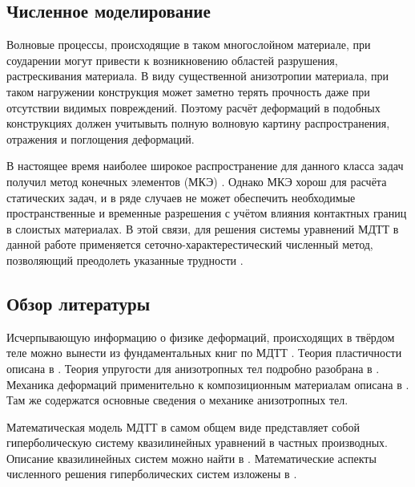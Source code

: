 \subsection*{Численное моделирование}
		
	Волновые процессы, происходящие в таком многослойном материале, при соударении могут привести к возникновению областей разрушения, растрескивания материала.
	В виду существенной анизотропии материала, при таком нагружении конструкция может заметно терять прочность даже при отсутствии видимых повреждений.
	Поэтому расчёт деформаций в подобных конструкциях должен учитывыть полную волновую картину распространения, отражения и поглощения деформаций.
	
	В настоящее время наиболее широкое распространение для данного класса задач получил метод конечных элементов (МКЭ) \cite{jp}. 
	Однако МКЭ хорош для расчёта статических задач, и в ряде случаев не может обеспечить необходимые пространственные и временные разрешения с учётом влияния контактных границ в слоистых материалах.
	В этой связи, для решения системы уравнений МДТТ в данной работе применяется сеточно-характерестический численный метод, позволяющий преодолеть указанные трудности \cite{magomedov, petrov_book, petrov_tormasov_holodov, petrov}.
	
\subsection*{Обзор литературы}
	
	Исчерпывающую информацию о физике деформаций, происходящих в твёрдом теле можно вынести из фундаментальных книг по МДТТ \cite{rabotnov,novatsky,sedov}.
	Теория пластичности описана в \cite{ilyushin}.
	Теория упругости для анизотропных тел подробно разобрана в \cite{lehnitsky}.
	Механика деформаций применительно к композиционным материалам описана в \cite{resler,pobedrya,bazhenov,simamura}.
	Там же содержатся основные сведения о механике анизотропных тел.
	
	Математическая модель МДТТ в самом общем виде представляет собой гиперболическую систему квазилинейных уравнений в частных производных.
	Описание квазилинейных систем можно найти в \cite{rozhdestvenskiy}. Математические аспекты численного решения гиперболических систем изложены в \cite{kulikovskiy}.
	
